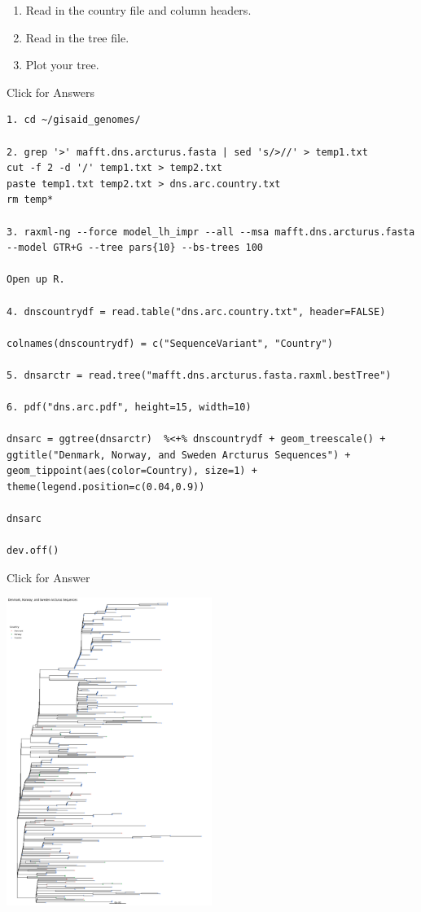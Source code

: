 \documentclass[
]{book}
\begin{document}
\begin{enumerate}
\def\labelenumi{\arabic{enumi}.}
\setcounter{enumi}{3}
\item
  Read in the country file and column headers.
\item
  Read in the tree file.
\item
  Plot your tree.
\end{enumerate}

Click for Answers

\begin{verbatim}
1. cd ~/gisaid_genomes/

2. grep '>' mafft.dns.arcturus.fasta | sed 's/>//' > temp1.txt
cut -f 2 -d '/' temp1.txt > temp2.txt
paste temp1.txt temp2.txt > dns.arc.country.txt
rm temp*

3. raxml-ng --force model_lh_impr --all --msa mafft.dns.arcturus.fasta --model GTR+G --tree pars{10} --bs-trees 100

Open up R.

4. dnscountrydf = read.table("dns.arc.country.txt", header=FALSE)

colnames(dnscountrydf) = c("SequenceVariant", "Country")

5. dnsarctr = read.tree("mafft.dns.arcturus.fasta.raxml.bestTree")

6. pdf("dns.arc.pdf", height=15, width=10)

dnsarc = ggtree(dnsarctr)  %<+% dnscountrydf + geom_treescale() + ggtitle("Denmark, Norway, and Sweden Arcturus Sequences") + geom_tippoint(aes(color=Country), size=1) + theme(legend.position=c(0.04,0.9))

dnsarc

dev.off()
\end{verbatim}

\hfill\break

Click for Answer

\includegraphics[width=0.5\textwidth,height=\textheight]{./Figures/dns.arc.png}
\end{document}
